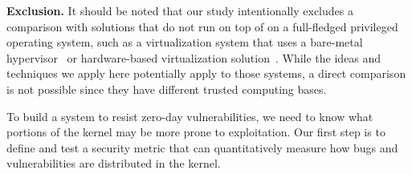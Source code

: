 \noindent
\textbf{Exclusion.}
It should be noted that our study intentionally excludes %
a comparison with solutions that do not run on top of on a 
full-fledged privileged operating system, such as a virtualization system that 
uses a bare-metal hypervisor~\cite{Xen-03, VMWare-Server} or 
hardware-based virtualization solution~\cite{IntelVT, keller2010nohype}. 
While the ideas and techniques we apply here potentially apply to those 
systems, a direct comparison is not possible since they have different
trusted computing bases.

To build a system to resist zero-day vulnerabilities, we need to know what
portions of the kernel may be more prone to exploitation. Our first step is to
define and test a security metric that can quantitatively measure how bugs and
vulnerabilities are distributed in the kernel.

